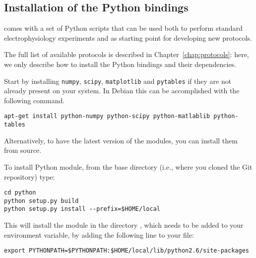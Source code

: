 \subsection{Installation of the Python bindings}
\progname comes with a set of Python scripts that can be used both to
perform standard electrophysiology experiments and as starting point
for developing new protocols.

The full list of available protocols is described in
Chapter~\ref{chap:protocols}: here, we only describe how to install
the Python bindings and their dependencies.

Start by installing  \texttt{numpy}, \texttt{scipy},
\texttt{matplotlib} and \texttt{pytables} if they are not already
present on your system. In Debian this can be accomplished with the
following command.
\begin{lstlisting}
apt-get install python-numpy python-scipy python-matlablib python-tables
\end{lstlisting}
Alternatively, to have the latest version of the modules, you can
install them from source.

To install \progname Python module, from the base directory (i.e.,
where you cloned the Git repository) type:
\begin{lstlisting}
cd python
python setup.py build
python setup.py install --prefix=$HOME/local
\end{lstlisting}

This will install the module in the directory
, which needs to
be added to your  environment variable, by
adding the following line to your  file:
\begin{lstlisting}
export PYTHONPATH=$PYTHONPATH:$HOME/local/lib/python2.6/site-packages
\end{lstlisting}


